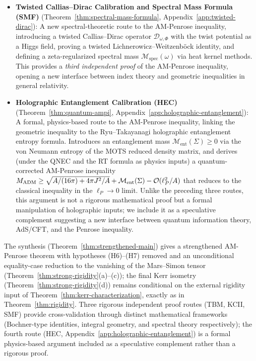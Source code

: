 \begin{itemize}[leftmargin=1.5em, itemsep=2pt]
    \item \textbf{Twisted Callias--Dirac Calibration and Spectral Mass Formula (SMF)} (Theorem~\ref{thm:spectral-mass-formula}, Appendix~\ref{app:twisted-dirac}): A new spectral-theoretic route to the AM-Penrose inequality, introducing a twisted Callias--Dirac operator $\mathcal{D}_{\omega,\Phi}$ with the twist potential as a Higgs field, proving a twisted Lichnerowicz--Weitzenb\"ock identity, and defining a zeta-regularized spectral mass $\mathcal{M}_{\mathrm{spec}}(\omega)$ via heat kernel methods. This provides a \emph{third independent proof} of the AM-Penrose inequality, opening a new interface between index theory and geometric inequalities in general relativity.
    \item \textbf{Holographic Entanglement Calibration (HEC)} (Theorem~\ref{thm:quantum-ampi}, Appendix~\ref{app:holographic-entanglement}): A formal, physics-based route to the AM-Penrose inequality, linking the geometric inequality to the Ryu--Takayanagi holographic entanglement entropy formula. Introduces an entanglement mass $\mathcal{M}_{\mathrm{ent}}(\Sigma) \geq 0$ via the von Neumann entropy of the MOTS reduced density matrix, and derives (under the QNEC and the RT formula as physics inputs) a quantum-corrected AM-Penrose inequality $M_{\mathrm{ADM}} \geq \sqrt{A/(16\pi) + 4\pi J^2/A} + \mathcal{M}_{\mathrm{ent}}(\Sigma) - \mathcal{O}(\ell_P^2/A)$ that reduces to the classical inequality in the $\ell_P \to 0$ limit. Unlike the preceding three routes, this argument is not a rigorous mathematical proof but a formal manipulation of holographic inputs; we include it as a speculative complement suggesting a new interface between quantum information theory, AdS/CFT, and the Penrose inequality.
\end{itemize}
The synthesis (Theorem~\ref{thm:strengthened-main}) gives a strengthened AM-Penrose theorem with hypotheses (H6)--(H7) removed and an unconditional equality-case reduction to the vanishing of the Mars--Simon tensor (Theorem~\ref{thm:strong-rigidity}(a)--(c)); the final Kerr isometry (Theorem~\ref{thm:strong-rigidity}(d)) remains conditional on the external rigidity input of Theorem~\ref{thm:kerr-characterization}, exactly as in Theorem~\ref{thm:rigidity}. Three rigorous independent proof routes (TBM, KCII, SMF) provide cross-validation through distinct mathematical frameworks (Bochner-type identities, integral geometry, and spectral theory respectively); the fourth route (HEC, Appendix~\ref{app:holographic-entanglement}) is a formal physics-based argument included as a speculative complement rather than a rigorous proof.
